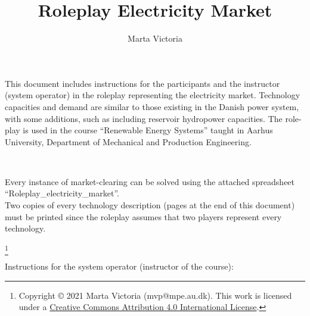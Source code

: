 \documentclass[3p]{elsarticle} %
\newcommand\blfootnote[1]{
  \begingroup
  \renewcommand\thefootnote{}\footnote{#1}
  \addtocounter{footnote}{-1}
  \endgroup
}
\begin{document}
\begin{frontmatter}

\title{ \textbf{Roleplay Electricity Market}}

\author[mymainaddress]{Marta Victoria}
\address[mymainaddress]{Department of Mechanical and Production Engineering, Aarhus University, Inge Lehmanns Gade 10, 8000 Aarhus, Denmark}

\end{frontmatter}
\thispagestyle{fancy}



This document includes instructions for the participants and the instructor (system operator) in the roleplay representing the electricity market. Technology capacities and demand are similar to those existing in the Danish power system, with some additions, such as including reservoir hydropower capacities. The role-play is used in the course “Renewable Energy Systems” taught in Aarhus University, Department of Mechanical and Production Engineering.

\

Every instance of market-clearing can be solved using the attached spreadsheet “Roleplay\_electricity\_market”.\\

Two copies of every technology description (pages at the end of this document) must be printed since the roleplay assumes that two players represent every technology.

\blfootnote{Copyright © 2021 Marta Victoria (mvp@mpe.au.dk). This work is licensed under a \href{https://creativecommons.org/licenses/by/4.0/} {Creative Commons Attribution 4.0 International License}.}


\newpage


Instructions for the system operator (instructor of the course):
\end{document}
